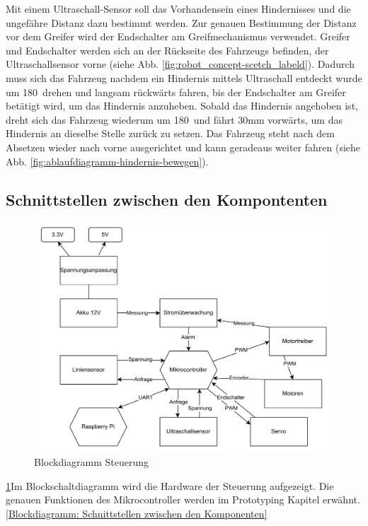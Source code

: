  Mit einem Ultraschall-Sensor soll das Vorhandensein eines Hindernisses und die ungefähre Distanz dazu bestimmt werden. Zur genauen Bestimmung der Distanz vor dem Greifer wird der Endschalter am Greifmechanismus verwendet.
Greifer und Endschalter werden sich an der Rückseite des Fahrzeugs befinden, der Ultraschallsensor vorne (siehe Abb. \ref{fig:robot_concept-scetch_labeld}). Dadurch muss sich das Fahrzeug nachdem ein Hindernis mittels Ultraschall entdeckt wurde um 180\textdegree\ drehen und langsam rückwärts fahren, bis der Endschalter am Greifer betätigt wird, um das Hindernis anzuheben. Sobald das Hindernis angehoben ist, dreht sich das Fahrzeug wiederum um 180\textdegree\ und fährt 30mm vorwärts, um das Hindernis an dieselbe Stelle zurück zu setzen. Das Fahrzeug steht nach dem Absetzen wieder nach vorne ausgerichtet und kann geradeaus weiter fahren (siehe  Abb. \ref{fig:ablaufdiagramm-hindernis-bewegen}).


\subsection{Schnittstellen zwischen den Kompontenten}




\begin{figure}[H]
    \centering
    \includegraphics[width=1\linewidth]{img/Blockdiagramm_Elektrotechnik.pdf}
    \caption{Blockdiagramm Steuerung}
    \label{Blockdiagramm Steuerung}
\end{figure}

\ref{Blockdiagramm Steuerung}Im Blockschaltdiagramm wird die Hardware der Steuerung aufgezeigt. Die genauen Funktionen des Mikrocontroller werden im Prototyping Kapitel erwähnt. \ref{Blockdiagramm: Schnittstellen zwischen den Komponenten}
